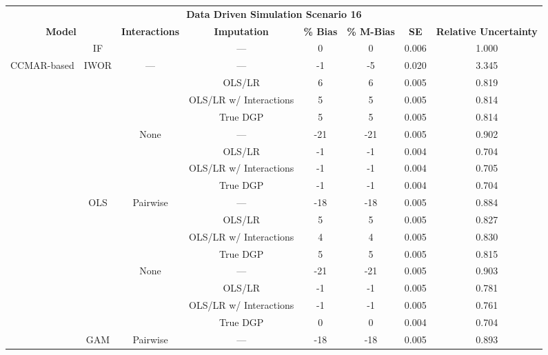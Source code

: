 \begin{table}
\centering
\begin{tabular}[ht]{|>{}c|c|c|c|c|c|c|>{}c|}
\hline
\multicolumn{8}{|c|}{\textbf{Data Driven Simulation Scenario 16}} \\
\cline{1-8}
\multicolumn{2}{|c|}{\textbf{Model}} & \textbf{Interactions} & \textbf{Imputation} & \textbf{\% Bias} & \textbf{\% M-Bias} & \textbf{SE} & \textbf{Relative Uncertainty}\\
\hline
 & IF &  & --- & 0 & 0 & 0.006 & 1.000\\
\cline{2-2}
\cline{4-8}
\multirow{-2}{*}{\centering\arraybackslash CCMAR-based} & IWOR & \multirow{-2}{*}{\centering\arraybackslash ---} & --- & -1 & -5 & 0.020 & 3.345\\
\cline{1-8}
 &  &  & OLS/LR & 6 & 6 & 0.005 & 0.819\\
\cline{4-8}
 &  &  & OLS/LR w/ Interactions & 5 & 5 & 0.005 & 0.814\\
\cline{4-8}
 &  &  & True DGP & 5 & 5 & 0.005 & 0.814\\
\cline{4-8}
 &  & \multirow{-4}{*}{\centering\arraybackslash None} & --- & -21 & -21 & 0.005 & 0.902\\
\cline{3-8}
 &  &  & OLS/LR & -1 & -1 & 0.004 & 0.704\\
\cline{4-8}
 &  &  & OLS/LR w/ Interactions & -1 & -1 & 0.004 & 0.705\\
\cline{4-8}
 &  &  & True DGP & -1 & -1 & 0.004 & 0.704\\
\cline{4-8}
 & \multirow{-8}{*}{\centering\arraybackslash OLS} & \multirow{-4}{*}{\centering\arraybackslash Pairwise} & --- & -18 & -18 & 0.005 & 0.884\\
\cline{2-8}
 &  &  & OLS/LR & 5 & 5 & 0.005 & 0.827\\
\cline{4-8}
 &  &  & OLS/LR w/ Interactions & 4 & 4 & 0.005 & 0.830\\
\cline{4-8}
 &  &  & True DGP & 5 & 5 & 0.005 & 0.815\\
\cline{4-8}
 &  & \multirow{-4}{*}{\centering\arraybackslash None} & --- & -21 & -21 & 0.005 & 0.903\\
\cline{3-8}
 &  &  & OLS/LR & -1 & -1 & 0.005 & 0.781\\
\cline{4-8}
 &  &  & OLS/LR w/ Interactions & -1 & -1 & 0.005 & 0.761\\
\cline{4-8}
 &  &  & True DGP & 0 & 0 & 0.004 & 0.704\\
\cline{4-8}
 & \multirow{-8}{*}{\centering\arraybackslash GAM} & \multirow{-4}{*}{\centering\arraybackslash Pairwise} & --- & -18 & -18 & 0.005 & 0.893\\

\end{tabular}
\end{table}
